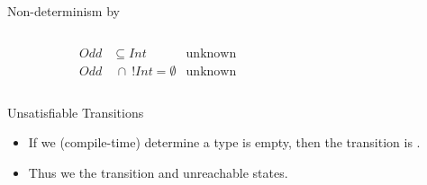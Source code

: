 \begin{frame}{Non-determinism by }
  \begin{columns}[T]
    \begin{column}{0.35\textwidth}
      \centering
      \begin{align*}
        Odd&\subseteq Int &\text{unknown}\\
        Odd&~\cap~ !Int = \emptyset &\text{unknown}
      \end{align*}
      \scalebox{1.0}{}%
    \end{column}%
    \begin{column}{0.7\textwidth}
    \end{column}
  \end{columns}
\end{frame}








\newsavebox\classbox
\begin{lrbox}{\classbox}
  \begin{minipage}{5cm}
    
  \end{minipage}
\end{lrbox}

\begin{frame}{Unsatisfiable Transitions}

  \scalebox{0.8}{}
  \begin{itemize}
  \item If we (compile-time) determine a type is empty, then the transition is .
  \item Thus we  the transition and unreachable states.

  \end{itemize}
\end{frame}


